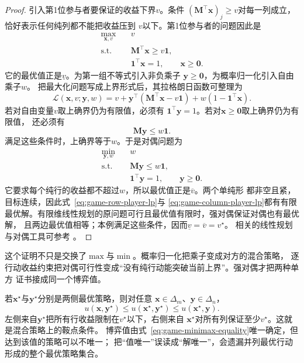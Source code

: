 \begin{proof}
引入第1位参与者要保证的收益下界\(v\)。条件
\((\bm{M}^{\top}\bm{x})_j\geq v\)对每一列成立，恰好表示任何纯列都不能把收益压到
\(v\)以下。第1位参与者的问题因此是
\begin{equation}
  \begin{aligned}
    \max_{\bm{x},v}\quad&v\\
    \text{s.t.}\quad&
      \bm{M}^{\top}\bm{x}\geq v\bm{1},\\
    &\bm{1}^{\top}\bm{x}=1,\qquad
      \bm{x}\geq\bm{0}.
  \end{aligned}
  \label{eq:game-row-player-lp}
\end{equation}
它的最优值正是\(\underline v\)。为第一组不等式引入非负乘子
\(\bm{y}\geq\bm{0}\)，为概率归一化引入自由乘子\(w\)。
把最大化问题写成上界形式后，其拉格朗日函数可整理为
\[
  \mathcal{L}(\bm{x},v;\bm{y},w)
  =
  v+\bm{y}^{\top}
  (\bm{M}^{\top}\bm{x}-v\bm{1})
  +w(1-\bm{1}^{\top}\bm{x}).
\]
若对自由变量\(v\)取上确界仍为有限值，必须有
\(\bm{1}^{\top}\bm{y}=1\)。若对\(\bm{x}\geq\bm{0}\)取上确界仍为有限值，
还必须有
\[
  \bm{M}\bm{y}\leq w\bm{1}.
\]
满足这些条件时，上确界等于\(w\)。于是对偶问题为
\begin{equation}
  \begin{aligned}
    \min_{\bm{y},w}\quad&w\\
    \text{s.t.}\quad&
      \bm{M}\bm{y}\leq w\bm{1},\\
    &\bm{1}^{\top}\bm{y}=1,\qquad
      \bm{y}\geq\bm{0}.
  \end{aligned}
  \label{eq:game-column-player-lp}
\end{equation}
它要求每个纯行的收益都不超过\(w\)，所以最优值正是\(\overline v\)。两个单纯形
都非空且紧，目标连续，因此式~\eqref{eq:game-row-player-lp}与
\eqref{eq:game-column-player-lp}都有有限最优解。有限维线性规划的原问题可行且最优值有限时，强对偶保证对偶也有最优解，
且两边最优值相等；本例满足这些条件，因而\(\underline v=\overline v=v^\star\)。
相关的线性规划与对偶工具可参考
。
\end{proof}

这个证明不只是交换了\(\max\)与\(\min\)。概率归一化把乘子变成对方的混合策略，
逐行动收益约束把对偶可行性变成“没有纯行动能突破当前上界”。强对偶才把两种单方
证书接成同一个博弈值。

若\(\bm{x}^\star\)与\(\bm{y}^\star\)分别是两侧最优策略，则对任意
\(\bm{x}\in\Delta_m\)、\(\bm{y}\in\Delta_n\)，
\begin{equation}
  u(\bm{x},\bm{y}^\star)
  \leq
  u(\bm{x}^\star,\bm{y}^\star)
  \leq
  u(\bm{x}^\star,\bm{y}).
  \label{eq:game-zero-sum-saddle}
\end{equation}
左侧来自\(\bm{y}^\star\)把所有行收益限制在\(v^\star\)以下，右侧来自
\(\bm{x}^\star\)对所有列保证至少\(v^\star\)。这就是混合策略上的鞍点条件。
博弈值由式~\eqref{eq:game-minimax-equality}唯一确定，但达到该值的策略可以不唯一；
把“值唯一”误读成“解唯一”，会遗漏并列最优行动形成的整个最优策略集合。

